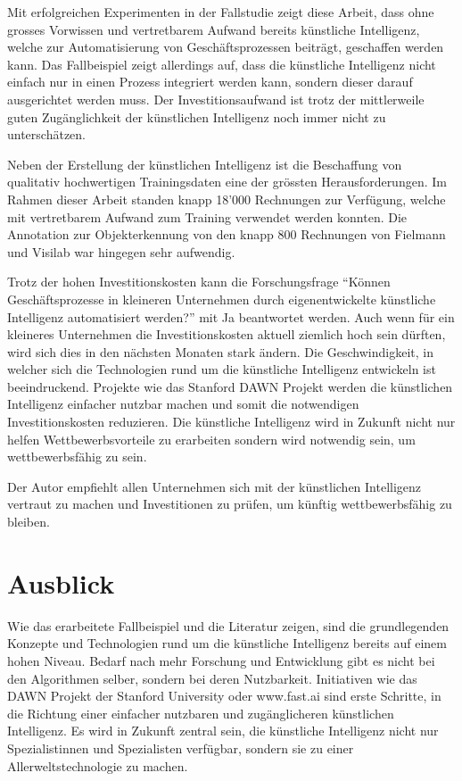 Mit erfolgreichen Experimenten in der Fallstudie zeigt diese Arbeit, dass ohne grosses Vorwissen und vertretbarem Aufwand bereits künstliche Intelligenz, welche zur Automatisierung von Geschäftsprozessen beiträgt, geschaffen werden kann. Das Fallbeispiel zeigt allerdings auf, dass die künstliche Intelligenz nicht einfach nur in einen Prozess integriert werden kann, sondern dieser darauf ausgerichtet werden muss. Der Investitionsaufwand ist trotz der mittlerweile guten Zugänglichkeit der künstlichen Intelligenz noch immer nicht zu unterschätzen.

Neben der Erstellung der künstlichen Intelligenz ist die Beschaffung von qualitativ hochwertigen Trainingsdaten eine der grössten Herausforderungen. Im Rahmen dieser Arbeit standen knapp 18'000 Rechnungen zur Verfügung, welche mit vertretbarem Aufwand zum Training verwendet werden konnten. Die Annotation zur Objekterkennung von den knapp 800 Rechnungen von Fielmann und Visilab war hingegen sehr aufwendig. 

Trotz der hohen Investitionskosten kann die Forschungsfrage \enquote{Können Geschäftsprozesse in kleineren Unternehmen durch eigenentwickelte künstliche Intelligenz automatisiert werden?} mit Ja beantwortet werden. Auch wenn für ein kleineres Unternehmen die Investitionskosten aktuell ziemlich hoch sein dürften, wird sich dies in den nächsten Monaten stark ändern. Die Geschwindigkeit, in welcher sich die Technologien rund um die künstliche Intelligenz entwickeln ist beeindruckend. Projekte wie das Stanford DAWN Projekt werden die künstlichen Intelligenz einfacher nutzbar machen und somit die notwendigen Investitionskosten reduzieren. Die künstliche Intelligenz wird in Zukunft nicht nur helfen Wettbewerbsvorteile zu erarbeiten sondern wird notwendig sein, um wettbewerbsfähig zu sein.

Der Autor empfiehlt allen Unternehmen sich mit der künstlichen Intelligenz vertraut zu machen und Investitionen zu prüfen, um künftig wettbewerbsfähig zu bleiben. 

\section{Ausblick}
\label{chap:ausblick}

Wie das erarbeitete Fallbeispiel und die Literatur zeigen, sind die grundlegenden Konzepte und Technologien rund um die künstliche Intelligenz bereits auf einem hohen Niveau. Bedarf nach mehr Forschung und Entwicklung gibt es nicht bei den Algorithmen selber, sondern bei deren Nutzbarkeit. Initiativen wie das DAWN Projekt der Stanford University oder www.fast.ai sind erste Schritte, in die Richtung einer einfacher nutzbaren und zugänglicheren künstlichen Intelligenz. Es wird in Zukunft zentral sein, die künstliche Intelligenz nicht nur Spezialistinnen und Spezialisten verfügbar, sondern sie zu einer Allerweltstechnologie zu machen. 

